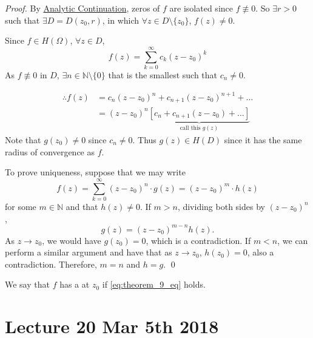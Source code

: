 \documentclass[notoc,notitlepage]{tufte-book}
\begin{document}
\begin{proof}
	By \hyperref[lemma:principle_of_analytic_continuation]{Analytic Continuation}, zeros of $f$ are isolated since $f \not\equiv 0$. So $\exists r > 0$ such that $\exists D = D(z_0, r)$, in which $\forall z \in D \setminus \{z_0\}$, $f(z) \neq 0$.

	Since $f \in H(\Omega)$, $\forall z \in D$,
	\begin{equation*}
		f(z) = \sum_{k=0}^{\infty} c_k (z - z_0)^k
	\end{equation*}
	As $f \not\equiv 0$ in $D$, $\exists n \in \mathbb{N} \setminus \{ 0\}$ that is the smallest such that $c_n \neq 0$.

	\begin{align*}
		\therefore f(z)
			&= c_n(z - z_0)^n + c_{n + 1} (z - z_0)^{n + 1} + \hdots \\
			&= (z - z_0)^n \underbrace{\left[ c_n + c_{n + 1} (z - z_0) + \hdots \right]}_{\text{call this } g(z)}
	\end{align*}
	Note that $g(z_0) \neq 0$ since $c_n \neq 0$. Thus $g(z) \in H(D)$ since it has the same radius of convergence as $f$.

	To prove uniqueness, suppose that we may write
	\begin{equation*}
		f(z) = \sum_{k=0}^{\infty} (z - z_0)^n \cdot g(z) = (z - z_0)^m \cdot h(z)
	\end{equation*}
	for some $m \in \mathbb{N}$ and that $h(z) \neq 0$. If $m > n$, dividing both sides by $(z - z_0)^n$,
	\begin{equation*}
		g(z) = (z - z_0)^{m - n} h(z).
	\end{equation*}
	As $z \to z_0$, we would have $g(z_0) = 0$, which is a contradiction. If $m < n$, we can perform a similar argument and have that as $z \to z_0$, $h(z_0) = 0$, also a contradiction. Therefore, $m = n$ and $h = g$. \qed
\end{proof}

We say that $f$ has a  at $z_0$ if \cref{eq:theorem_9_eq} holds.



\chapter{Lecture 20 Mar 5th 2018}
	\label{chapter:lecture_20_mar_5th_2018}
\end{document}
